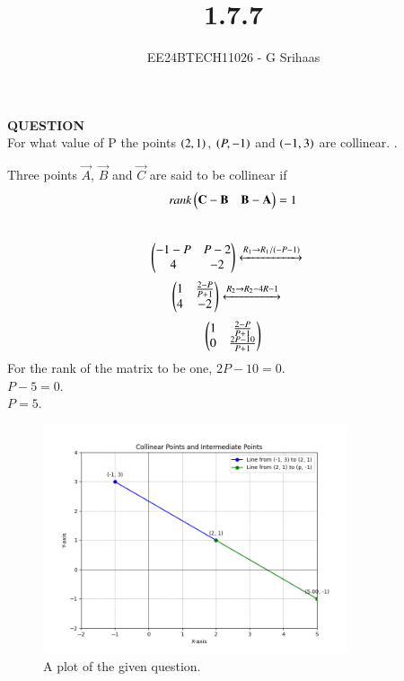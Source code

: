 \documentclass[journal]{IEEEtran}
\begin{document}

\vspace{3cm}

\title{1.7.7}
\author{EE24BTECH11026 - G Srihaas}
{\let\newpage\relax\maketitle}

\renewcommand{\thefigure}{\theenumi}
\renewcommand{\thetable}{\theenumi}
\setlength{\intextsep}{10pt} %


\renewcommand{\thetable}{\theenumi}

\textbf{QUESTION} \\
For what value of P  the points $\left(2,1\right)$, $\left(P,-1\right)$ and $\left(-1,3\right)$ are collinear. \hfill{}.\\
\solution
 

Three points $\vec{A}$, $\vec{B}$ and $\vec{C}$ are said to be collinear if $$\emph{rank}\begin{pmatrix}\mathbf{C}-\mathbf{B} & \mathbf{B} - \mathbf{A}\end{pmatrix} = 1 $$ \\
\begin{align}
\begin{pmatrix} -1-P & P-2 \\
         4 & -2 \end{pmatrix} 
\xleftrightarrow[]{R_1 \rightarrow {R_1/(-P-1)}}\quad
\end{align}
\begin{align}
\begin{pmatrix} 1 & \frac{2-P}{P+1} \\
         4 & -2 \end{pmatrix} 
\xleftrightarrow[]{R_2 \rightarrow {R_2-4R-1}}\quad
\end{align}
\begin{align}
\begin{pmatrix} 1 & \frac{2-P}{P+1} \\
         0 & \frac{2P-10}{P+1} \end{pmatrix} 
\end{align}
For the rank of the matrix to be one, $2P-10=0$.\\
$P-5=0$.\\
$P=5$.


\begin{figure}[ht]
	\centering
	\includegraphics[width=0.8\textwidth]{figs/fig.png}
	\caption{A plot of the given question.}
	\label{fig:Plot1}
\end{figure}

	
\end{document}
